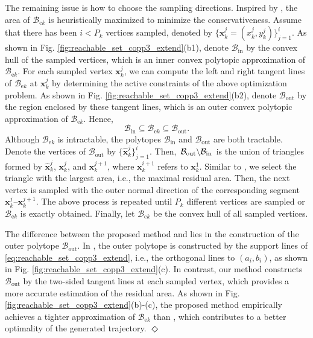 \documentclass[journal]{IEEEtran}
\theoremstyle{definition}
\theoremstyle{definition}
\newtheorem*{remark}{Remark}
\let\oldremark\remark
\let\endoldremark\endremark
\renewenvironment{remark}
  {\oldremark}
  {\hfill$\Diamond$\endoldremark}
\newcommand{\Setminus}[2]{{\left.#1\middle\backslash #2\right.}}
\renewcommand\vector[1]{\boldsymbol{#1}}
\newcommand\vx{{\vector{x}}}
\begin{document}
The remaining issue is how to choose the sampling directions. Inspired by \cite{dio2025time}, the area of $\mathcal{B}_{\text{c}k}$ is heuristically maximized to minimize the conservativeness. Assume that there has been $i<P_k$ vertices sampled, denoted by $\{\vx_k^j=(x_k^j, y_k^j)\}_{j=1}^i$. As shown in Fig. \ref{fig:reachable_set_copp3_extend}(b1), denote $\mathcal{B}_\text{in}$ by the convex hull of the sampled vertices, which is an inner convex polytopic approximation of $\mathcal{B}_{\text{e}k}$. For each sampled vertex $\vx_k^j$, we can compute the left and right tangent lines of $\mathcal{B}_{\text{e}k}$ at $\vx_k^j$ by determining the active constraints of the above optimization problem. As shown in Fig. \ref{fig:reachable_set_copp3_extend}(b2), denote $\mathcal{B}_{\text{out}}$ by the region enclosed by these tangent lines, which is an outer convex polytopic approximation of $\mathcal{B}_{\text{e}k}$. Hence,
\begin{equation}
    \mathcal{B}_\text{in}\subseteq\mathcal{B}_{\text{e}k}\subseteq\mathcal{B}_\text{out}.
\end{equation}
Although $\mathcal{B}_{\text{e}k}$ is intractable, the polytopes $\mathcal{B}_\text{in}$ and $\mathcal{B}_\text{out}$ are both tractable. Denote the vertices of $\mathcal{B}_\text{out}$ by $\{\hat{\vx}_k^j\}_{j=1}^i$. Then, $\Setminus{\mathcal{B}_\text{out}}{\mathcal{B}_\text{in}}$ is the union of triangles formed by $\hat{\vx}_k^j$, $\vx_k^j$, and $\vx_k^{j+1}$, where $\vx_k^{i+1}$ refers to $\vx_k^1$. Similar to \cite{dio2025time}, we select the triangle with the largest area, i.e., the maximal residual area. Then, the next vertex is sampled with the outer normal direction of the corresponding segment $\vx_k^j$--$\vx_k^{j+1}$. The above process is repeated until $P_k$ different vertices are sampled or $\mathcal{B}_{\text{e}k}$ is exactly obtained. Finally, let $\mathcal{B}_{\text{c}k}$ be the convex hull of all sampled vertices.

\begin{remark}
    The difference between the proposed method and \cite{dio2025time} lies in the construction of the outer polytope $\mathcal{B}_\text{out}$. In \cite{dio2025time}, the outer polytope is constructed by the support lines of \eqref{eq:reachable_set_copp3_extend}, i.e., the orthogonal lines to $(a_i,b_i)$, as shown in Fig. \ref{fig:reachable_set_copp3_extend}(c). In contrast, our method constructs $\mathcal{B}_\text{out}$ by the two-sided tangent lines at each sampled vertex, which provides a more accurate estimation of the residual area. As shown in Fig. \ref{fig:reachable_set_copp3_extend}(b)-(c), the proposed method empirically achieves a tighter approximation of $\mathcal{B}_{\text{e}k}$ than \cite{dio2025time}, which contributes to a better optimality of the generated trajectory.
\end{remark}
\end{document}
